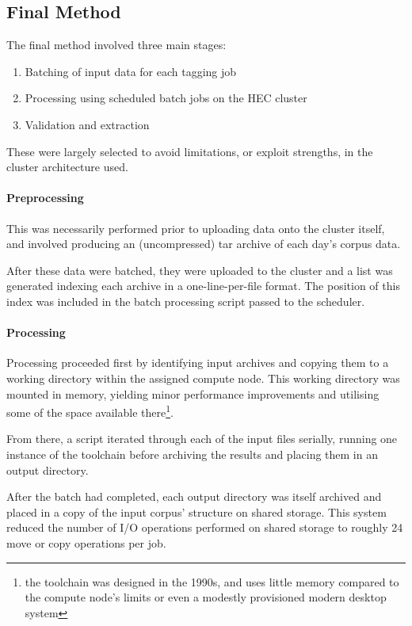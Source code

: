 \subsection{Final Method}
The final method involved three main stages:

\begin{enumerate}
    \item Batching of input data for each tagging job
    \item Processing using scheduled batch jobs on the HEC cluster
    \item Validation and extraction
\end{enumerate}

These were largely selected to avoid limitations, or exploit strengths, in the cluster architecture used.

\paragraph{Preprocessing}
This was necessarily performed prior to uploading data onto the cluster itself, and involved producing an (uncompressed) tar archive of each day's corpus data.

After these data were batched, they were uploaded to the cluster and a list was generated indexing each archive in a one-line-per-file format.  The position of this index was included in the batch processing script passed to the scheduler.

\paragraph{Processing}
Processing proceeded first by identifying input archives and copying them to a working directory within the assigned compute node.  This working directory was mounted in memory, yielding minor performance improvements and utilising some of the space available there\footnote{the toolchain was designed in the 1990s, and uses little memory compared to the compute node's limits or even a modestly provisioned modern desktop system}.

From there, a script iterated through each of the input files serially, running one instance of the toolchain before archiving the results and placing them in an output directory.

After the batch had completed, each output directory was itself archived and placed in a copy of the input corpus' structure on shared storage.  This system reduced the number of I/O operations performed on shared storage to roughly 24 move or copy operations per job.

